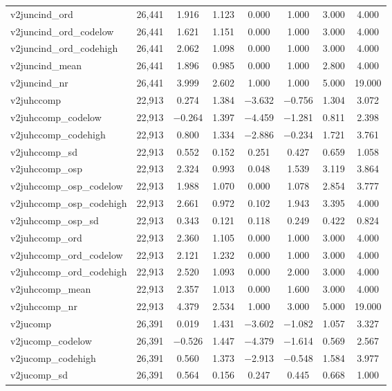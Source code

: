 \begin{table}[!htbp]
\begin{tabular}{@{\extracolsep{5pt}}lccccccc}
v2juncind\_ord & 26,441 & 1.916 & 1.123 & 0.000 & 1.000 & 3.000 & 4.000 \\ 
v2juncind\_ord\_codelow & 26,441 & 1.621 & 1.151 & 0.000 & 1.000 & 3.000 & 4.000 \\ 
v2juncind\_ord\_codehigh & 26,441 & 2.062 & 1.098 & 0.000 & 1.000 & 3.000 & 4.000 \\ 
v2juncind\_mean & 26,441 & 1.896 & 0.985 & 0.000 & 1.000 & 2.800 & 4.000 \\ 
v2juncind\_nr & 26,441 & 3.999 & 2.602 & 1.000 & 1.000 & 5.000 & 19.000 \\ 
v2juhccomp & 22,913 & 0.274 & 1.384 & $-$3.632 & $-$0.756 & 1.304 & 3.072 \\ 
v2juhccomp\_codelow & 22,913 & $-$0.264 & 1.397 & $-$4.459 & $-$1.281 & 0.811 & 2.398 \\ 
v2juhccomp\_codehigh & 22,913 & 0.800 & 1.334 & $-$2.886 & $-$0.234 & 1.721 & 3.761 \\ 
v2juhccomp\_sd & 22,913 & 0.552 & 0.152 & 0.251 & 0.427 & 0.659 & 1.058 \\ 
v2juhccomp\_osp & 22,913 & 2.324 & 0.993 & 0.048 & 1.539 & 3.119 & 3.864 \\ 
v2juhccomp\_osp\_codelow & 22,913 & 1.988 & 1.070 & 0.000 & 1.078 & 2.854 & 3.777 \\ 
v2juhccomp\_osp\_codehigh & 22,913 & 2.661 & 0.972 & 0.102 & 1.943 & 3.395 & 4.000 \\ 
v2juhccomp\_osp\_sd & 22,913 & 0.343 & 0.121 & 0.118 & 0.249 & 0.422 & 0.824 \\ 
v2juhccomp\_ord & 22,913 & 2.360 & 1.105 & 0.000 & 1.000 & 3.000 & 4.000 \\ 
v2juhccomp\_ord\_codelow & 22,913 & 2.121 & 1.232 & 0.000 & 1.000 & 3.000 & 4.000 \\ 
v2juhccomp\_ord\_codehigh & 22,913 & 2.520 & 1.093 & 0.000 & 2.000 & 3.000 & 4.000 \\ 
v2juhccomp\_mean & 22,913 & 2.357 & 1.013 & 0.000 & 1.600 & 3.000 & 4.000 \\ 
v2juhccomp\_nr & 22,913 & 4.379 & 2.534 & 1.000 & 3.000 & 5.000 & 19.000 \\ 
v2jucomp & 26,391 & 0.019 & 1.431 & $-$3.602 & $-$1.082 & 1.057 & 3.327 \\ 
v2jucomp\_codelow & 26,391 & $-$0.526 & 1.447 & $-$4.379 & $-$1.614 & 0.569 & 2.567 \\ 
v2jucomp\_codehigh & 26,391 & 0.560 & 1.373 & $-$2.913 & $-$0.548 & 1.584 & 3.977 \\ 
v2jucomp\_sd & 26,391 & 0.564 & 0.156 & 0.247 & 0.445 & 0.668 & 1.000 \\ 

\end{tabular}
\end{table}
